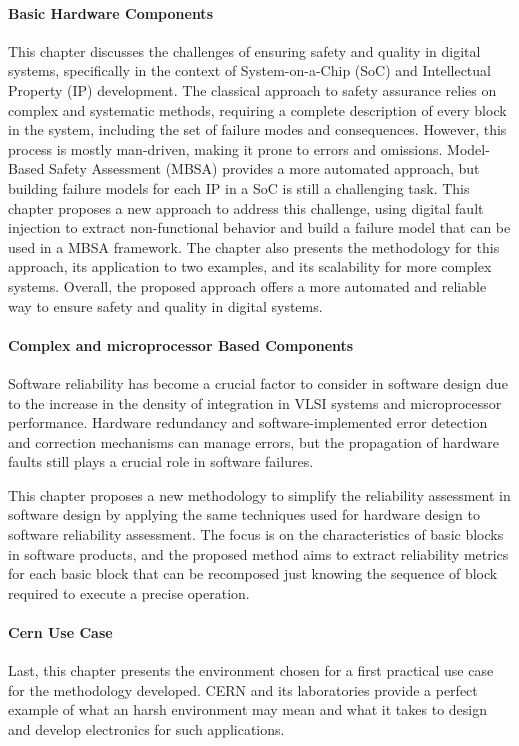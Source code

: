 \documentclass[./dissertation.tex]{subfiles}
\begin{document}
\paragraph{Basic Hardware Components}
This chapter discusses the challenges of ensuring safety and quality in digital systems, specifically in the context of System-on-a-Chip (SoC) and Intellectual Property (IP) development. The classical approach to safety assurance relies on complex and systematic methods, requiring a complete description of every block in the system, including the set of failure modes and consequences. However, this process is mostly man-driven, making it prone to errors and omissions. Model-Based Safety Assessment (MBSA) provides a more automated approach, but building failure models for each IP in a SoC is still a challenging task. This chapter proposes a new approach to address this challenge, using digital fault injection to extract non-functional behavior and build a failure model that can be used in a MBSA framework. The chapter also presents the methodology for this approach, its application to two examples, and its scalability for more complex systems. Overall, the proposed approach offers a more automated and reliable way to ensure safety and quality in digital systems.
\paragraph{Complex and microprocessor Based Components}
Software reliability has become a crucial factor to consider in software design due to the increase in the density of integration in VLSI systems and microprocessor performance. Hardware redundancy and software-implemented error detection and correction mechanisms can manage errors, but the propagation of hardware faults still plays a crucial role in software failures.

This chapter proposes a new methodology to simplify the reliability assessment in software design by applying the same techniques used for hardware design to software reliability assessment. The focus is on the characteristics of basic blocks in software products, and the proposed method aims to extract reliability metrics for each basic block that can be recomposed just knowing the sequence of block required to execute a precise operation.
\paragraph{Cern Use Case}
Last, this chapter presents the environment chosen for a first practical use case for the methodology developed. CERN and its laboratories provide a perfect example of what an harsh environment may mean and what it takes to design and develop electronics for such applications.
\end{document}
